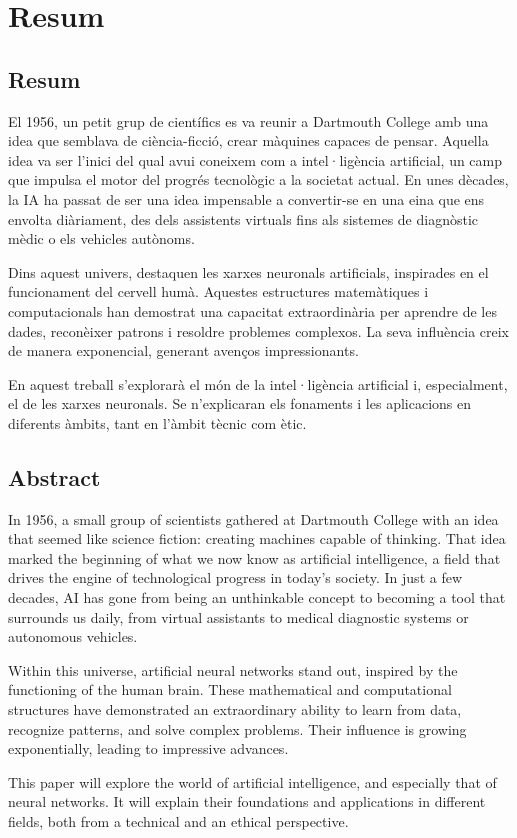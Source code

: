 \chapter{Resum}
\label{c:Resum}
\section{Resum}
El 1956, un petit grup de científics es va reunir a Dartmouth College amb una idea que semblava de ciència-ficció, crear màquines capaces de pensar. Aquella idea va ser l'inici del qual avui coneixem com a intel·ligència artificial, un camp que impulsa el motor del progrés tecnològic a la societat actual. En unes dècades, la IA ha passat de ser una idea impensable a convertir-se en una eina que ens envolta diàriament, des dels assistents virtuals fins als sistemes de diagnòstic mèdic o els vehicles autònoms.

Dins aquest univers, destaquen les xarxes neuronals artificials, inspirades en el funcionament del cervell humà. Aquestes estructures matemàtiques i computacionals han demostrat una capacitat extraordinària per aprendre de les dades, reconèixer patrons i resoldre problemes complexos. La seva influència creix de manera exponencial, generant avenços impressionants.

En aquest treball s'explorarà el món de la intel·ligència artificial i, especialment, el de les xarxes neuronals. Se n'explicaran els fonaments i les aplicacions en diferents àmbits, tant en l'àmbit tècnic com ètic.

\section{Abstract}
In 1956, a small group of scientists gathered at Dartmouth College with an idea that seemed like science fiction: creating machines capable of thinking. That idea marked the beginning of what we now know as artificial intelligence, a field that drives the engine of technological progress in today’s society. In just a few decades, AI has gone from being an unthinkable concept to becoming a tool that surrounds us daily, from virtual assistants to medical diagnostic systems or autonomous vehicles.

Within this universe, artificial neural networks stand out, inspired by the functioning of the human brain. These mathematical and computational structures have demonstrated an extraordinary ability to learn from data, recognize patterns, and solve complex problems. Their influence is growing exponentially, leading to impressive advances.

This paper will explore the world of artificial intelligence, and especially that of neural networks. It will explain their foundations and applications in different fields, both from a technical and an ethical perspective.
